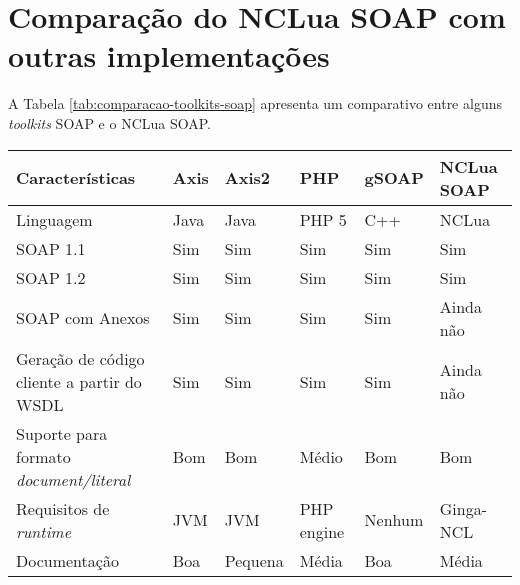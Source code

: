 \section{Comparação do NCLua SOAP com outras implementações}

A Tabela \ref{tab:comparacao-toolkits-soap} apresenta um comparativo entre alguns \textit{toolkits} SOAP
e o NCLua SOAP.

\begin{center}
\scriptsize{
	\begin{tabular}{|p{5.5cm}|p{1cm}|p{1cm}|p{1.5cm}|p{1.2cm}|p{2cm}|} %
  \hline
		\textbf{Características} & 
		\textbf{Axis} &
		\textbf{Axis2} &		
		\textbf{PHP} &		
		\textbf{gSOAP} &		
		\textbf{NCLua SOAP} 
    \\
  \hline
		Linguagem & Java & Java & PHP 5 & C++ & NCLua \\  
  \hline
		SOAP 1.1 & Sim & Sim & Sim & Sim & Sim \\  
  \hline
		SOAP 1.2 & Sim & Sim & Sim & Sim & Sim \\  
  \hline
		SOAP com Anexos & Sim & Sim & Sim & Sim & Ainda não \\  
  \hline
		Geração de código cliente a partir do WSDL & Sim & Sim & Sim & Sim & Ainda não \\  
  \hline
		Suporte para formato \textit{document/literal} & Bom & Bom & Médio & Bom & Bom \\  
  \hline
		Requisitos de \textit{runtime} & JVM & JVM & PHP engine & Nenhum & Ginga-NCL \\  
  \hline
		Documentação & Boa & Pequena & Média & Boa & Média \\  		
	\hline
	\end{tabular}
	\label{tab:comparacao-toolkits-soap}
}
\end{center}
